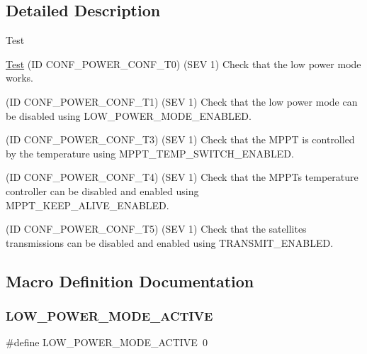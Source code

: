 \subsection{Detailed Description}
\begin{DoxyRefDesc}{Test}
\item[\hyperlink{test__test000018}{Test}](ID C\+O\+N\+F\+\_\+\+P\+O\+W\+E\+R\+\_\+\+C\+O\+N\+F\+\_\+\+T0) (S\+EV 1) Check that the low power mode works. 

(ID C\+O\+N\+F\+\_\+\+P\+O\+W\+E\+R\+\_\+\+C\+O\+N\+F\+\_\+\+T1) (S\+EV 1) Check that the low power mode can be disabled using L\+O\+W\+\_\+\+P\+O\+W\+E\+R\+\_\+\+M\+O\+D\+E\+\_\+\+E\+N\+A\+B\+L\+ED. 

(ID C\+O\+N\+F\+\_\+\+P\+O\+W\+E\+R\+\_\+\+C\+O\+N\+F\+\_\+\+T3) (S\+EV 1) Check that the M\+P\+PT is controlled by the temperature using M\+P\+P\+T\+\_\+\+T\+E\+M\+P\+\_\+\+S\+W\+I\+T\+C\+H\+\_\+\+E\+N\+A\+B\+L\+ED. 

(ID C\+O\+N\+F\+\_\+\+P\+O\+W\+E\+R\+\_\+\+C\+O\+N\+F\+\_\+\+T4) (S\+EV 1) Check that the M\+P\+PT\textquotesingle{}s temperature controller can be disabled and enabled using M\+P\+P\+T\+\_\+\+K\+E\+E\+P\+\_\+\+A\+L\+I\+V\+E\+\_\+\+E\+N\+A\+B\+L\+ED. 

(ID C\+O\+N\+F\+\_\+\+P\+O\+W\+E\+R\+\_\+\+C\+O\+N\+F\+\_\+\+T5) (S\+EV 1) Check that the satellite\textquotesingle{}s transmissions can be disabled and enabled using T\+R\+A\+N\+S\+M\+I\+T\+\_\+\+E\+N\+A\+B\+L\+ED.\end{DoxyRefDesc}


\subsection{Macro Definition Documentation}
\mbox{\label{group__defines__default__power__configuration_gad0d7265d491052179cfbffc68a891cc6}} 
\subsubsection{\texorpdfstring{L\+O\+W\+\_\+\+P\+O\+W\+E\+R\+\_\+\+M\+O\+D\+E\+\_\+\+A\+C\+T\+I\+VE}{LOW\_POWER\_MODE\_ACTIVE}}
{\footnotesize\ttfamily \#define L\+O\+W\+\_\+\+P\+O\+W\+E\+R\+\_\+\+M\+O\+D\+E\+\_\+\+A\+C\+T\+I\+VE~0}

